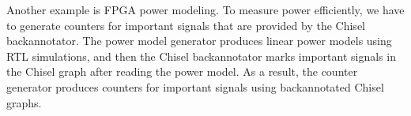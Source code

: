 Another example is FPGA power modeling. To measure power efficiently, we have to generate counters for important signals that are provided by the Chisel backannotator. The power model generator produces linear power models using RTL simulations, and then the Chisel backannotator marks important signals in the Chisel graph after reading the power model. As a result, the counter generator produces counters for important signals using backannotated Chisel graphs.